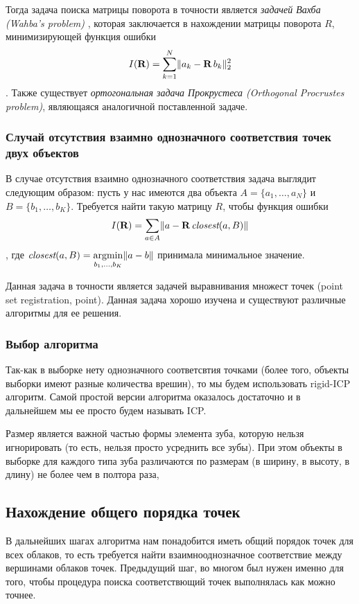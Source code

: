 Тогда задача поиска матрицы поворота в точности является \textit{задачей Вахба (Wahba's problem)} \cite{wahba}, которая заключается в нахождении матрицы поворота $R$, минимизирующей функция ошибки \[I(\textbf{R}) = \sum_{k=1}^{N}  \lVert a_{k} - \textbf{R} \, b_{k}\rVert_{2}^{2} \]. Также существует \textit{ортогональная задача Прокрустеса (Orthogonal Procrustes problem)}, являющаяся аналогичной поставленной задаче.

\subsubsection{Случай отсутствия взаимно однозначного соответствия точек двух объектов}

В случае отсутствия взаимно однозначного соответствия задача выглядит следующим образом: пусть у нас имеются два объекта $A = \{a_{1}, \ldots, a_{N}\}$ и $B = \{b_{1}, \ldots, b_{K}\}$. Требуется найти такую матрицу $R$, чтобы функция ошибки \[I(\textbf{R}) = \sum\limits_{a \in A} \lVert a - \textbf{R} \, \textit{closest}(a, B)\rVert \], где $\textit{closest}(a, B) = \operatorname*{argmin}\limits_{b_{1}, \dots , b_{K}} \lVert a - b\rVert$ принимала минимальное значение.


Данная задача в точности является задачей выравнивания множест точек (point set registration, point). Данная задача хорошо изучена и существуют различные алгоритмы для ее решения.


\subsubsection{Выбор алгоритма}
Так-как в выборке нету однозначного соответсвтия точками (более того, объекты выборки имеют разные количества врешин), то мы будем использовать rigid-ICP алгоритм. Самой простой версии алгоритма оказалось достаточно и в дальнейшем мы ее просто будем называть ICP.

Размер является важной частью формы элемента зуба, которую нельзя игнорировать (то есть, нельзя просто усреднить все зубы). При этом объекты в выборке для каждого типа зуба различаются по размерам (в ширину, в высоту, в длину) не более чем в полтора раза, 


\subsection{Нахождение общего порядка точек}

В дальнейших шагах алгоритма нам понадобится иметь общий порядок точек для всех облаков, то есть требуется найти взаимнооднозначное соответствие между вершинами облаков точек. Предыдущий шаг, во многом был нужен именно для того, чтобы процедура поиска соответствющий точек выполнялась как можно точнее. 


